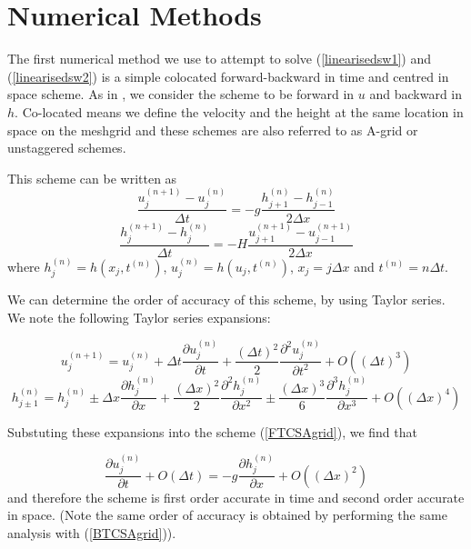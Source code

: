 \documentclass[a4paper,12pt, notitlepage]{report}
\begin{document}
\section*{Numerical Methods}

The first numerical method we use to attempt to solve (\ref{linearisedsw1}) and (\ref{linearisedsw2}) is a simple colocated forward-backward in time and centred in space scheme. As in \cite{MPE textbook}, we consider the scheme to be forward in $u$ and backward in $h$. Co-located means we define the velocity and the height at the same location in space on the meshgrid and these schemes are also referred to as A-grid or unstaggered schemes.

This scheme can be written as 
\begin{equation} \label{FTCSAgrid}
\frac{u_{j}^{(n+1)} - u_{j}^{(n)}}{\Delta t} = -g \frac{h_{j+1}^{(n)} - h_{j-1}^{(n)}}{2\Delta x}
\end{equation}
\begin{equation}\label{BTCSAgrid}
\frac{h_{j}^{(n+1)} - h_{j}^{(n)}}{\Delta t} = -H \frac{u_{j+1}^{(n+1)} - u_{j-1}^{(n+1)}}{2\Delta x}
\end{equation}
where $h_{j}^{(n)} = h(x_{j}, t^{(n)})$, $u_{j}^{(n)} = h(u_{j}, t^{(n)})$, $x_{j} = j\Delta x$ and $t^{(n)} = n\Delta t$. 

We can determine the order of accuracy of this scheme, by using Taylor series. We note the following Taylor series expansions:

\begin{equation}\label{ujn+1}
u_{j}^{(n+ 1)} = u_{j}^{(n)} + \Delta t \frac{\partial u_{j}^{(n)}}{\partial t} + \frac{(\Delta t)^{2}}{2}\frac{\partial^{2} u_{j}^{(n)}}{\partial t^{2}} + O((\Delta t)^{3})
\end{equation}
\begin{equation}\label{hj+-1n}
h_{j \pm 1}^{(n)} = h_{j}^{(n)} \pm \Delta x  \frac{\partial h_{j}^{(n)}}{\partial x} + \frac{(\Delta x)^{2}}{2}\frac{\partial^{2} h_{j}^{(n)}}{\partial x^{2}} \pm \frac{(\Delta x)^{3}}{6}\frac{\partial^{3} h_{j}^{(n)}}{\partial x^{3}} + O((\Delta x)^{4})
\end{equation}

Substuting these expansions into the scheme (\ref{FTCSAgrid}), we find that 

\begin{equation}
\frac{\partial u_{j}^{(n)}}{\partial t} + O(\Delta t) =  -g \frac{\partial h_{j}^{(n)}}{\partial x} + O((\Delta x)^{2})
\end{equation} 
and therefore the scheme is first order accurate in time and second order accurate in space. (Note the same order of accuracy is obtained by performing the same analysis with (\ref{BTCSAgrid})).
\end{document}
